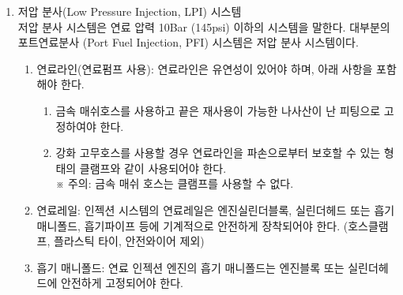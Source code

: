 \documentclass[final,a4paper,10pt]{report}
\begin{document}
\begin{enumerate}
\begin{enumerate}

      \item\label{rule:formula-technical.fuel-system.fuel-lines.worm-gear-clamp-sleeve} 웜기어 방식의 호스 클램프 사용 시에는 연료라인이 손상되지 않도록 연료라인 외부에 보호 플라스틱을 사용하고 그 겉에 웜기어 방식의 호스 클램프를 사용할 수 있다.
      \item\label{rule:formula-technical.fuel-system.fuel-lines.mounting-not-through-cockpit} 연료라인은 차량에 안전하게 고정되어야 한다. 모든 연료라인은 운전석을 통과해서는 안 되며 모든 충돌과 파손으로부터 보호되어야 한다.
    \end{enumerate}

  \item\label{rule:formula-technical.fuel-system.low-pressure-injection} 저압 분사(Low Pressure Injection, LPI) 시스템\\
    저압 분사 시스템은 연료 압력 10Bar (145psi) 이하의 시스템을 말한다. 대부분의 포트연료분사 (Port Fuel Injection, PFI) 시스템은 저압 분사 시스템이다.

    \begin{enumerate}
      \item\label{rule:formula-technical.fuel-system.low-pressure-injection.flexible-fuel-line} 연료라인(연료펌프 사용): 연료라인은 유연성이 있어야 하며, 아래 사항을 포함해야 한다.
        \begin{enumerate}
          \item\label{rule:formula-technical.fuel-system.low-pressure-injection.flexible-fuel-line.metal-mesh-threaded-fittings} 금속 매쉬호스를 사용하고 끝은 재사용이 가능한 나사산이 난 피팅으로 고정하여야 한다.
          \item\label{rule:formula-technical.fuel-system.low-pressure-injection.flexible-fuel-line.reinforced-rubber-hose-clamp} 강화 고무호스를 사용할 경우 연료라인을 파손으로부터 보호할 수 있는 형태의 클램프와 같이 사용되어야 한다.\\
          ※ 주의: 금속 매쉬 호스는 클램프를 사용할 수 없다.
        \end{enumerate}

      \item\label{rule:formula-technical.fuel-system.low-pressure-injection.fuel-rail-mounting} 연료레일: 인젝션 시스템의 연료레일은 엔진실린더블록, 실린더헤드 또는 흡기 매니폴드, 흡기파이프 등에 기계적으로 안전하게 장착되어야 한다. (호스클램프, 플라스틱 타이, 안전와이어 제외)
      \item\label{rule:formula-technical.fuel-system.low-pressure-injection.intake-manifold-mounting} 흡기 매니폴드: 연료 인젝션 엔진의 흡기 매니폴드는 엔진블록 또는 실린더헤드에 안전하게 고정되어야 한다.
    \end{enumerate}


\end{enumerate}
\end{document}
